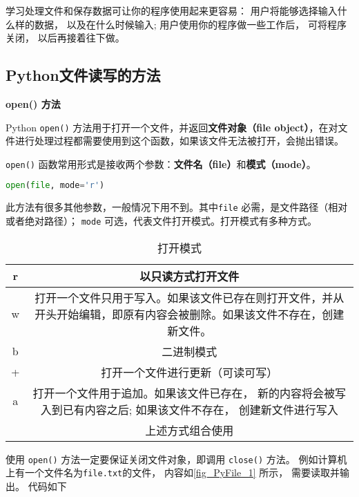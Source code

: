 

学习处理文件和保存数据可让你的程序使用起来更容易： 用户将能够选择输入什么样的数据， 以及在什么时候输入; 用户使用你的程序做一些工作后， 可将程序关闭， 以后再接着往下做。

\subsection{Python文件读写的方法}
\textbf{open() 方法}

Python \verb`open()` 方法用于打开一个文件，并返回\textbf{文件对象（file object）}，在对文件进行处理过程都需要使用到这个函数，如果该文件无法被打开，会抛出错误。

\verb`open()` 函数常用形式是接收两个参数：\textbf{文件名（file）}和\textbf{模式（mode）}。
\begin{lstlisting}[language=python]
open(file, mode='r')
\end{lstlisting}
此方法有很多其他参数，一般情况下用不到。其中\verb`file` 必需，是文件路径（相对或者绝对路径）； \verb`mode` 可选，代表文件打开模式。打开模式有多种方式。
\begin{table}[ht]
\centering
\caption{打开模式}\label{tab_PyFile_1}
\begin{tabular}{|c|c|}
\hline
r & 以只读方式打开文件 \\
\hline
w & 打开一个文件只用于写入。如果该文件已存在则打开文件，并从开头开始编辑，即原有内容会被删除。如果该文件不存在，创建新文件。 \\
\hline
b & 二进制模式 \\
\hline
+ & 打开一个文件进行更新（可读可写） \\
\hline
a & 打开一个文件用于追加。如果该文件已存在， 新的内容将会被写入到已有内容之后; 如果该文件不存在， 创建新文件进行写入 \\
\hline
&上述方式组合使用   \\
\hline
\end{tabular}
\end{table}

使用 \verb`open()` 方法一定要保证关闭文件对象，即调用 \verb`close()` 方法。 例如计算机上有一个文件名为\verb`file.txt`的文件， 内容如\autoref{fig_PyFile_1} 所示， 需要读取并输出。 代码如下

